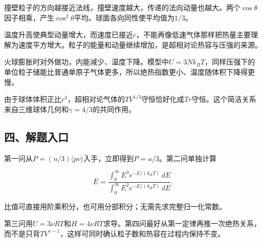 \documentclass[12pt,a4paper,fontset=fandol]{ctexart}
\begin{document}
撞壁粒子的方向越接近法线，撞壁速度越大，传递的法向动量也越大。两个\(\cos\theta\)因子相乘，产生\(\cos^2\theta\)平均。球面各向同性使平均值为\(1/3\)。

\begin{center}
\begin{minipage}{\linewidth}
\centering\begingroup{}
\ifdim\wd\diagrambox>.88\linewidth
\sbox{\diagrambox}{\resizebox{.88\linewidth}{!}{\usebox{\diagrambox}}}\fi
\ifdim\ht\diagrambox>.38\textheight
\resizebox{!}{.38\textheight}{\usebox{\diagrambox}}
\else\usebox{\diagrambox}\fi
\par{}\endgroup\end{minipage}\end{center}

温度升高使典型动量增大，而速度已接近\(c\)，不能再像低速气体那样把热量主要理解为速度平方增大。粒子的能量和动量继续增加，是超相对论热容与压强的来源。

火球膨胀时对外做功，内能减少、温度下降。模型中\(U=3Nk_BT\)，同样压强下的单位粒子储能比普通单原子气体更多，所以绝热指数更小、温度随体积下降得更慢。

由于球体体积正比\(r^3\)，超相对论气体的\(TV^{1/3}\)守恒恰好化成\(Tr\)守恒。这个简洁关系来自三维球体几何和\(\gamma=4/3\)的共同作用。

\subsection{四、解题入口}\label{ux56dbux89e3ux9898ux5165ux53e3-6}

第一问从\(P=(n/3)\langle pv\rangle\)入手，立即得到\(P=u/3\)。第二问单独计算

\[
\bar E=
\frac{\int_0^\infty E^3e^{-E/(k_BT)}\,dE}
{\int_0^\infty E^2e^{-E/(k_BT)}\,dE}.
\]

比值可直接用阶乘积分，也可用分部积分；无需先求完整归一化常数。

第三问用\(U=3\nu RT\)和\(H=4\nu RT\)求导。第四问最好从第一定律再推一次绝热关系，而不是只背\(TV^{\gamma-1}\)，这样可同时确认粒子数和热容在过程内保持不变。
\end{document}

